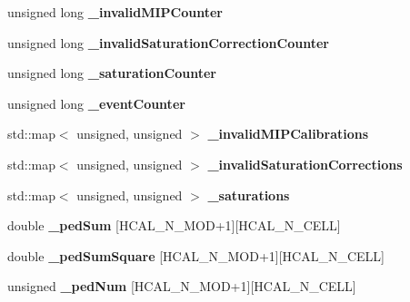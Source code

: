 \begin{DoxyCompactItemize}
\item 
unsigned long {\bfseries \-\_\-invalid\-M\-I\-P\-Counter}\label{classCALICE_1_1IntegratedHcalCalibrationProcessor_a8abdbee26c81f4aa9336ff5b07ef9cde}

\item 
unsigned long {\bfseries \-\_\-invalid\-Saturation\-Correction\-Counter}\label{classCALICE_1_1IntegratedHcalCalibrationProcessor_a34510ab0a63023762ef2eb82b3e57587}

\item 
unsigned long {\bfseries \-\_\-saturation\-Counter}\label{classCALICE_1_1IntegratedHcalCalibrationProcessor_aaf95bbbe9b7d96f34c900eaedc800a15}

\item 
unsigned long {\bfseries \-\_\-event\-Counter}\label{classCALICE_1_1IntegratedHcalCalibrationProcessor_a244b0feb4e3c0dbc80cdb881d33531a0}

\item 
std\-::map$<$ unsigned, unsigned $>$ {\bfseries \-\_\-invalid\-M\-I\-P\-Calibrations}\label{classCALICE_1_1IntegratedHcalCalibrationProcessor_a865d6e28f28638bf3af375cb31555db4}

\item 
std\-::map$<$ unsigned, unsigned $>$ {\bfseries \-\_\-invalid\-Saturation\-Corrections}\label{classCALICE_1_1IntegratedHcalCalibrationProcessor_a1a8724c11472e790d565b76438f3d6cc}

\item 
std\-::map$<$ unsigned, unsigned $>$ {\bfseries \-\_\-saturations}\label{classCALICE_1_1IntegratedHcalCalibrationProcessor_aec10a6498f7f035f9909bfc1d87aeeb7}

\item 
double {\bfseries \-\_\-ped\-Sum} [H\-C\-A\-L\-\_\-\-N\-\_\-\-M\-O\-D+1][H\-C\-A\-L\-\_\-\-N\-\_\-\-C\-E\-L\-L]\label{classCALICE_1_1IntegratedHcalCalibrationProcessor_a62f50a5f4d2f7b8f1a346c01f6b0d8df}

\item 
double {\bfseries \-\_\-ped\-Sum\-Square} [H\-C\-A\-L\-\_\-\-N\-\_\-\-M\-O\-D+1][H\-C\-A\-L\-\_\-\-N\-\_\-\-C\-E\-L\-L]\label{classCALICE_1_1IntegratedHcalCalibrationProcessor_a452abcc49cbfe1c24f9671d1864c39a8}

\item 
unsigned {\bfseries \-\_\-ped\-Num} [H\-C\-A\-L\-\_\-\-N\-\_\-\-M\-O\-D+1][H\-C\-A\-L\-\_\-\-N\-\_\-\-C\-E\-L\-L]\label{classCALICE_1_1IntegratedHcalCalibrationProcessor_aadb43e8133ddf7a6fc74f6812fa65d53}


\end{DoxyCompactItemize}
